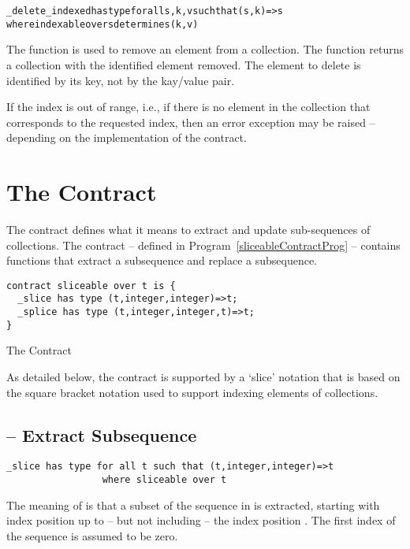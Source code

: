 \begin{alltt}
_delete_indexed has type for all s,k,v such that (s,k)=>s
                           where indexable over s determines (k,v)
\end{alltt}
The  function is used to remove an element from a collection. The  function returns a collection with the identified element removed. The element to delete is identified by its key, not by the kay/value pair.

\begin{aside}
If the index is out of range, i.e., if there is no element in the collection that corresponds to the requested index, then an error exception may be raised -- depending on the implementation of the contract.
\end{aside}

\section{The  Contract}
\label{sliceableContract}
The  contract defines what it means to extract and update sub-sequences of collections. The contract -- defined in Program~\vref{sliceableContractProg} -- contains functions that extract a subsequence and replace a subsequence.
\begin{program}[htb]
\begin{lstlisting}
contract sliceable over t is {
  _slice has type (t,integer,integer)=>t;
  _splice has type (t,integer,integer,t)=>t;
}
\end{lstlisting}
\caption{The  Contract\label{sliceableContractProg}}
\end{program}
As detailed below, the  contract is supported by a `slice' notation that is based on the square bracket notation used to support indexing elements of collections.

\subsection{ -- Extract Subsequence}
\label{sliceFunction}
\begin{lstlisting}
_slice has type for all t such that (t,integer,integer)=>t
                 where sliceable over t
\end{lstlisting}
The meaning of  is that a subset of the sequence in  is extracted, starting with index position  up to -- but not including -- the index position . The first index of the sequence is assumed to be zero.

